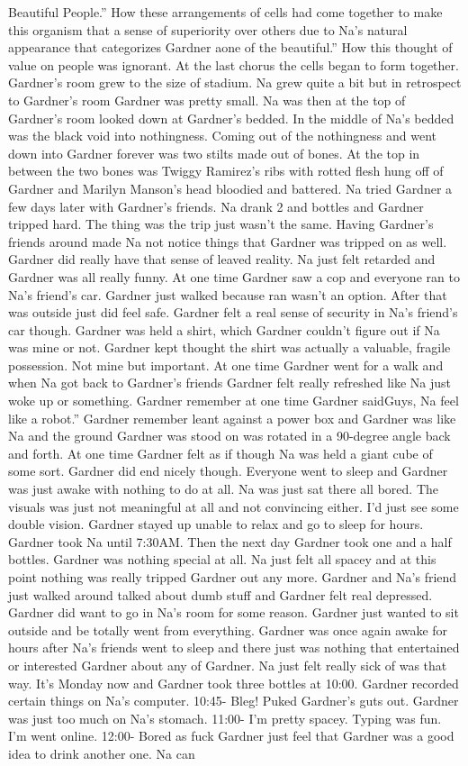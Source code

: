\documentclass[12pt]{book}
\begin{document}
Beautiful People.'' How these arrangements of cells had come together to make this organism that a sense of superiority over others due to Na's natural appearance that categorizes Gardner aone of the beautiful.'' How this thought of value on people was ignorant. At the last chorus the cells began to form together. Gardner's room grew to the size of stadium. Na grew quite a bit but in retrospect to Gardner's room Gardner was pretty small. Na was then at the top of Gardner's room looked down at Gardner's bedded. In the middle of Na's bedded was the black void into nothingness. Coming out of the nothingness and went down into Gardner forever was two stilts made out of bones. At the top in between the two bones was Twiggy Ramirez's ribs with rotted flesh hung off of Gardner and Marilyn Manson's head bloodied and battered. Na tried Gardner a few days later with Gardner's friends. Na drank 2 and  bottles and Gardner tripped hard. The thing was the trip just wasn't the same. Having Gardner's friends around made Na not notice things that Gardner was tripped on as well. Gardner did really have that sense of leaved reality. Na just felt retarded and Gardner was all really funny. At one time Gardner saw a cop and everyone ran to Na's friend's car. Gardner just walked because ran wasn't an option. After that was outside just did feel safe. Gardner felt a real sense of security in Na's friend's car though. Gardner was held a shirt, which Gardner couldn't figure out if Na was mine or not. Gardner kept thought the shirt was actually a valuable, fragile possession. Not mine but important. At one time Gardner went for a walk and when Na got back to Gardner's friends Gardner felt really refreshed like Na just woke up or something. Gardner remember at one time Gardner saidGuys, Na feel like a robot.'' Gardner remember leant against a power box and Gardner was like Na and the ground Gardner was stood on was rotated in a 90-degree angle back and forth. At one time Gardner felt as if though Na was held a giant cube of some sort. Gardner did end nicely though. Everyone went to sleep and Gardner was just awake with nothing to do at all. Na was just sat there all bored. The visuals was just not meaningful at all and not convincing either. I'd just see some double vision. Gardner stayed up unable to relax and go to sleep for hours. Gardner took Na until 7:30AM. Then the next day Gardner took one and a half bottles. Gardner was nothing special at all. Na just felt all spacey and at this point nothing was really tripped Gardner out any more. Gardner and Na's friend just walked around talked about dumb stuff and Gardner felt real depressed. Gardner did want to go in Na's room for some reason. Gardner just wanted to sit outside and be totally went from everything. Gardner was once again awake for hours after Na's friends went to sleep and there just was nothing that entertained or interested Gardner about any of Gardner. Na just felt really sick of was that way. It's Monday now and Gardner took three bottles at 10:00. Gardner recorded certain things on Na's computer. 10:45- Bleg! Puked Gardner's guts out. Gardner was just too much on Na's stomach. 11:00- I'm pretty spacey. Typing was fun. I'm went online. 12:00- Bored as fuck Gardner just feel that Gardner was a good idea to drink another one. Na can 
\end{document}

